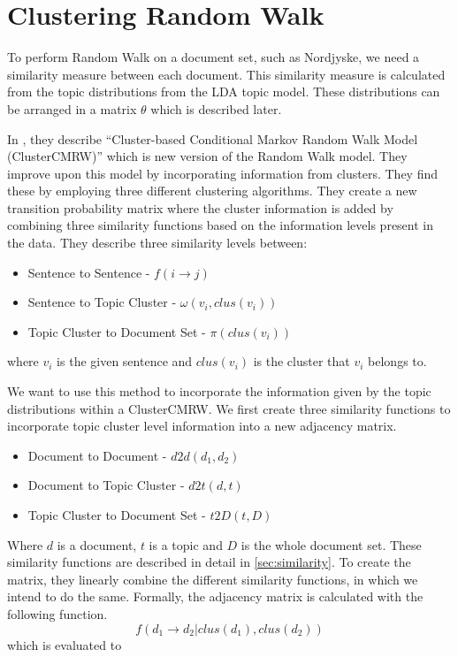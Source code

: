 \section{Clustering Random Walk}
To perform Random Walk on a document set, such as Nordjyske, we need a similarity measure between each document.
This similarity measure is calculated from the topic distributions from the LDA topic model.
These distributions can be arranged in a matrix $\theta$ which is described later.

In \cite{ClusterPageRank}, they describe ``Cluster-based Conditional Markov Random Walk Model (ClusterCMRW)'' which is new version of the Random Walk model. They improve upon this model by incorporating information from clusters. 
They find these by employing three different clustering algorithms.
They create a new transition probability matrix where the cluster information is added by combining three similarity functions based on the information levels present in the data.
They describe three similarity levels between:
\begin{itemize}
    \item Sentence to Sentence - $f(i \rightarrow j)$
    \item Sentence to Topic Cluster - $\omega(v_i, clus(v_i))$
    \item Topic Cluster to Document Set - $\pi(clus(v_i))$
\end{itemize}
where $v_i$ is the given sentence and $clus(v_i)$ is the cluster that $v_i$ belongs to.

We want to use this method to incorporate the information given by the topic distributions within a ClusterCMRW. 
We first create three similarity functions to incorporate topic cluster level information into a new adjacency matrix.
\begin{itemize}
    \item Document to Document - $d2d(d_1, d_2)$
    \item Document to Topic Cluster - $d2t(d,t)$
    \item Topic Cluster to Document Set - $t2D(t, D)$
\end{itemize}

\noindent
Where $d$ is a document, $t$ is a topic and $D$ is the whole document set.
These similarity functions are described in detail in \autoref{sec:similarity}.
To create the matrix, they linearly combine the different similarity functions, in which we intend to do the same.
Formally, the adjacency matrix is calculated with the following function.
$$ f(d_1 \rightarrow d_2 | clus(d_1), clus(d_2)) $$
which is evaluated to 


